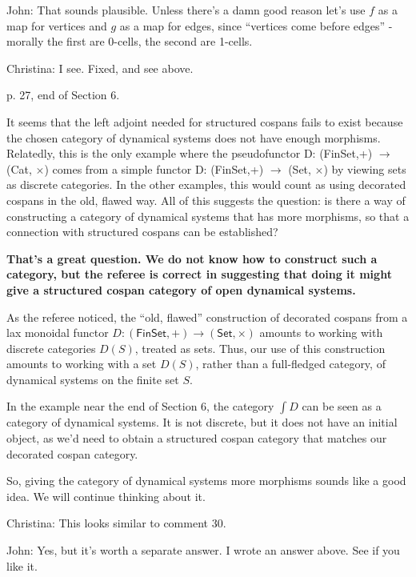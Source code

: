 \documentclass[reqno]{amsart}
\def\chris{\color{purple} Christina: }
\def\john{\color{red} John: }
\begin{document}
\begin{enumerate}
{{\john That sounds plausible.  Unless there's a damn good reason let's use $f$ as a map for vertices and $g$ as a map for edges, since ``vertices come 
before edges'' - morally the first are 0-cells, the second are 1-cells.}

{\chris I see. Fixed, and see above.}
\fi

\item p. 27, end of Section 6.

It seems that the left adjoint needed for structured cospans fails to exist because the chosen category of dynamical systems does not have enough 
morphisms. Relatedly, this is the only example where the pseudofunctor D: (FinSet,+) $\to$ (Cat, $\times$) comes from a simple functor D: (FinSet,+) 
$\to$ (Set, $\times$) by viewing sets as discrete categories. In the other examples, this would count as using decorated cospans in the old, flawed 
way. 
All of this suggests the question: is there a way of constructing a category of dynamical systems that has more morphisms, so that a connection with 
structured cospans can be established?

{\bf That's a great question.   We do not know how to construct such a category, but the referee
is correct in suggesting that doing it might give a structured cospan category of open dynamical
systems.    

As the referee noticed, the ``old, flawed'' construction of 
decorated cospans from a lax monoidal functor $D \colon (\mathsf{FinSet},+) \to 
(\mathsf{Set}, \times) $ amounts to working with discrete categories $D(S)$, treated
as sets.  Thus, our use of this construction amounts to working with a
set $D(S)$, rather than a full-fledged category, of dynamical systems on the finite set $S$.

In the example near the end of Section 6, the category $\int \! D$ can be seen as a category
of dynamical systems.   It is not discrete, but it does not have an initial object, as we'd
need to obtain a structured cospan
category that matches our decorated cospan category.   

So, giving the category of dynamical systems more morphisms sounds like a good idea. We will continue thinking about it.}  


\iffalse
{\chris This looks similar to comment 30.}

{\john Yes, but it's worth a separate answer.   I wrote an answer above.  See if you like it.  }

}
\end{enumerate}
\end{document}
